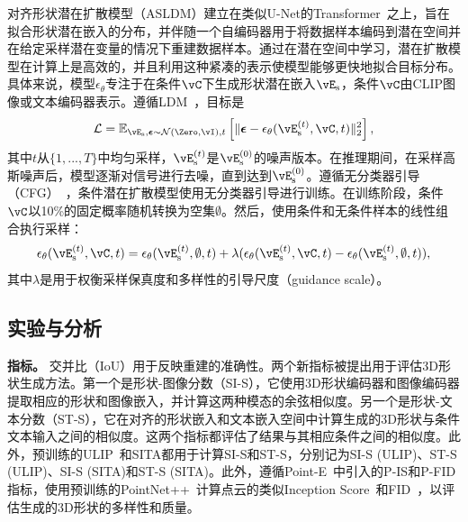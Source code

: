 \documentclass[../../book-main_zh.tex]{subfiles}
\begin{document}
对齐形状潜在扩散模型（ASLDM）建立在类似U-Net的Transformer~\cite{10203178}之上，旨在拟合形状潜在嵌入的分布，并伴随一个自编码器用于将数据样本编码到潜在空间并在给定采样潜在变量的情况下重建数据样本。通过在潜在空间中学习，潜在扩散模型在计算上是高效的，并且利用这种紧凑的表示使模型能够更快地拟合目标分布。具体来说，模型$\epsilon_{\theta}$专注于在条件$\vC$下生成形状潜在嵌入$\vE_{\mathrm{s}}$，条件$\vC$由CLIP图像或文本编码器表示。遵循LDM~\cite{rombach2022high}，目标是
\begin{equation}
\mathcal{L} = \mathbb{E}_{\vE_{\mathrm{s}}, \boldsymbol{\epsilon} \sim
\mathcal{N}(\Zero,\vI),t} \left[ \Vert \boldsymbol{\epsilon}
- \epsilon_\theta(\vE_{\mathrm{s}}^{(t)}, \vC, t) \Vert^2_2 \right],
\end{equation}
其中$t$从$\{1, ..., T\}$中均匀采样，$\vE_{\mathrm{s}}^{(t)}$是$\vE_{\mathrm{s}}^{(0)}$的噪声版本。在推理期间，在采样高斯噪声后，模型逐渐对信号进行去噪，直到达到$\vE_{\mathrm{s}}^{(0)}$。遵循无分类器引导（CFG）~\cite{ho2021classifierfree}，条件潜在扩散模型使用无分类器引导进行训练。在训练阶段，条件$\vC$以10\%的固定概率随机转换为空集$\emptyset$。然后，使用条件和无条件样本的线性组合执行采样：
\begin{equation}
\epsilon_\theta ( \vE_{\mathrm{s}}^{(t)}, \vC, t ) = \epsilon_\theta(
\vE_{\mathrm{s}}^{(t)}, \emptyset, t ) + \lambda
( \epsilon_\theta( \vE_{\mathrm{s}}^{(t)}, \vC, t ) -\epsilon_\theta(
\vE_{\mathrm{s}}^{(t)}, \emptyset, t ) ),
\label{eq:cfg-michelangelo}
\end{equation}
其中$\lambda$是用于权衡采样保真度和多样性的引导尺度（guidance scale）。

\subsection{实验与分析}

\textbf{指标。}
交并比（IoU）用于反映重建的准确性。两个新指标被提出用于评估3D形状生成方法。第一个是形状-图像分数（SI-S），它使用3D形状编码器和图像编码器提取相应的形状和图像嵌入，并计算这两种模态的余弦相似度。另一个是形状-文本分数（ST-S），它在对齐的形状嵌入和文本嵌入空间中计算生成的3D形状与条件文本输入之间的相似度。这两个指标都评估了结果与其相应条件之间的相似度。此外，预训练的ULIP~\cite{10203465}和SITA都用于计算SI-S和ST-S，分别记为SI-S (ULIP)、ST-S (ULIP)、SI-S (SITA)和ST-S (SITA)。此外，遵循Point-E~\cite{nichol2022point}中引入的P-IS和P-FID指标，使用预训练的PointNet++~\cite{NIPS2017_d8bf84be}计算点云的类似Inception Score~\cite{NIPS2016_8a3363ab}和FID~\cite{NIPS2017_8a1d6947}，以评估生成的3D形状的多样性和质量。
\end{document}
